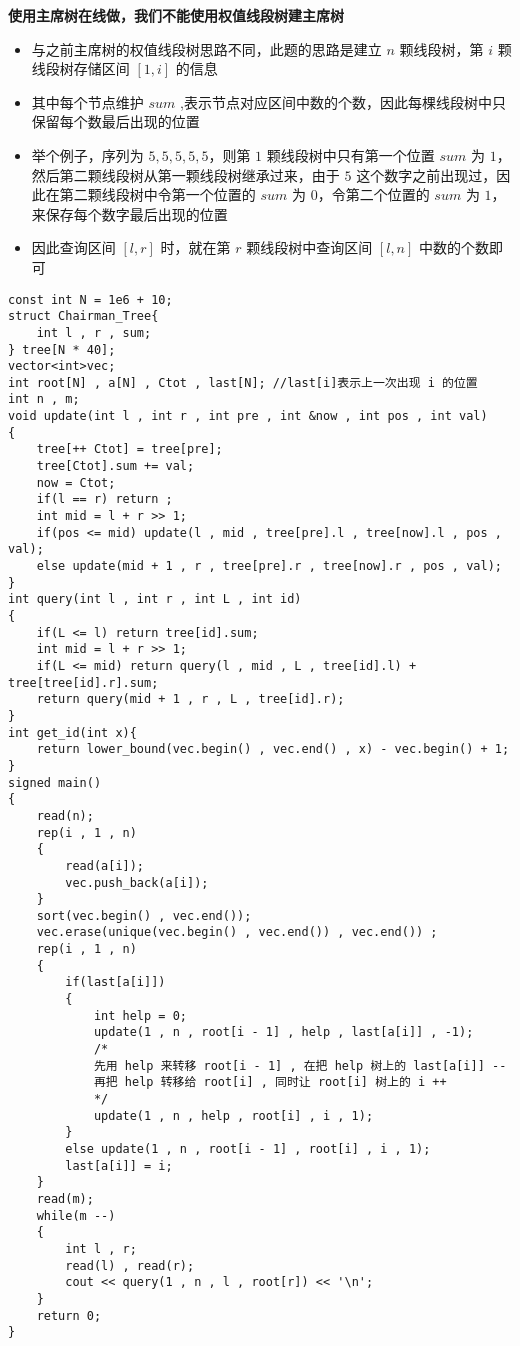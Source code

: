 \documentclass[E:/GsjzTle/main/main.tex]{subfiles}
\begin{document}
\textbf{使用主席树在线做，我们不能使用权值线段树建主席树}

\begin{itemize}
\item
  与之前主席树的权值线段树思路不同，此题的思路是建立 \(n\) 颗线段树，第
  \(i\) 颗线段树存储区间 \([1,i]\) 的信息
\item
  其中每个节点维护 \(sum\)
  ,表示节点对应区间中数的个数，因此每棵线段树中只保留每个数最后出现的位置
\item
  举个例子，序列为 \(5,5,5,5,5\)，则第 \(1\) 颗线段树中只有第一个位置
  \(sum\) 为 \(1\)，然后第二颗线段树从第一颗线段树继承过来，由于 \(5\)
  这个数字之前出现过，因此在第二颗线段树中令第一个位置的 \(sum\) 为
  \(0\)，令第二个位置的 \(sum\) 为 \(1\)，来保存每个数字最后出现的位置
\item
  因此查询区间 \([ l , r ]\) 时，就在第 \(r\) 颗线段树中查询区间
  \([ l ,n]\) 中数的个数即可
\end{itemize}

\begin{lstlisting}
const int N = 1e6 + 10;
struct Chairman_Tree{
	int l , r , sum;
} tree[N * 40];
vector<int>vec;
int root[N] , a[N] , Ctot , last[N]; //last[i]表示上一次出现 i 的位置
int n , m;
void update(int l , int r , int pre , int &now , int pos , int val)
{
	tree[++ Ctot] = tree[pre];
	tree[Ctot].sum += val;
	now = Ctot;
	if(l == r) return ;
	int mid = l + r >> 1;
	if(pos <= mid) update(l , mid , tree[pre].l , tree[now].l , pos , val);
	else update(mid + 1 , r , tree[pre].r , tree[now].r , pos , val);
}
int query(int l , int r , int L , int id)
{
	if(L <= l) return tree[id].sum;
	int mid = l + r >> 1;
	if(L <= mid) return query(l , mid , L , tree[id].l) + tree[tree[id].r].sum;
	return query(mid + 1 , r , L , tree[id].r);
}
int get_id(int x){
	return lower_bound(vec.begin() , vec.end() , x) - vec.begin() + 1;
}
signed main()
{
	read(n);
	rep(i , 1 , n)
	{
		read(a[i]);
		vec.push_back(a[i]);
	}
	sort(vec.begin() , vec.end());
	vec.erase(unique(vec.begin() , vec.end()) , vec.end()) ;
	rep(i , 1 , n)
	{
		if(last[a[i]])
		{
			int help = 0;
			update(1 , n , root[i - 1] , help , last[a[i]] , -1);
			/*
			先用 help 来转移 root[i - 1] , 在把 help 树上的 last[a[i]] --
			再把 help 转移给 root[i] , 同时让 root[i] 树上的 i ++
			*/
			update(1 , n , help , root[i] , i , 1);
		}
		else update(1 , n , root[i - 1] , root[i] , i , 1);
		last[a[i]] = i;
	}
	read(m);
	while(m --)
	{
		int l , r;
		read(l) , read(r);
		cout << query(1 , n , l , root[r]) << '\n';
	}
	return 0;
}
\end{lstlisting}
\end{document}
